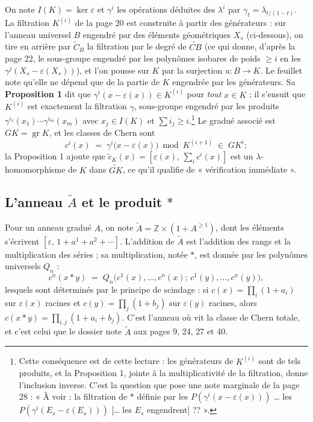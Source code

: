 \documentclass[11pt,a4paper]{article}
\begin{document}
On note $I(K) = \ker \varepsilon$ et $\gamma^{i}$ les opérations déduites des
$\lambda^{i}$ par $\gamma_{t} = \lambda_{t/(1-t)}$. La filtration $K^{(i)}$
de la page 20 est construite à partir des générateurs : sur l'anneau universel
$B$ engendré par des éléments géométriques $X_{s}$ (ci-dessous), on tire en
arrière par $\widetilde{C}_{B}$ la filtration par le degré de
$\widetilde{CB}$ (ce qui donne, d'après la page 22, le sous-groupe engendré
par les polynômes isobares de poids $\geqslant i$ en les
$\gamma^{j}(X_{s} - \varepsilon(X_{s}))$), et l'on pousse sur $K$ par la
surjection $u : B \to K$. Le feuillet note qu'elle ne dépend que de la partie de
$K$ engendrée par les générateurs. Sa \textbf{Proposition 1} dit que
$\gamma^{i}(x - \varepsilon(x)) \in K^{(i)}$ pour \emph{tout} $x \in K$ ; il
s'ensuit que $K^{(i)}$ est exactement la filtration $\gamma$, sous-groupe
engendré par les produits $\gamma^{i_{1}}(x_{1})\cdots\gamma^{i_{m}}(x_{m})$
avec $x_{j} \in I(K)$ et $\sum i_{j} \geqslant i$.\footnote{Cette conséquence
est de cette lecture : les générateurs de $K^{(i)}$ sont de tels produits, et
la Proposition 1, jointe à la multiplicativité de la filtration, donne
l'inclusion inverse. C'est la question que pose une note marginale de la page
28 : « À voir : la filtration de $\ast$ définie par les
$P(\gamma^{i}(x - \varepsilon(x)))$ \ldots{} les
$P(\gamma^{i}(E_{s} - \varepsilon(E_{s})))$ [\ldots{} les $E_{s}$
engendrent] ?? ».} Le gradué associé est $GK = \operatorname{gr} K$, et les
classes de Chern sont
\[
  c^{i}(x) \;=\; \gamma^{i}\bigl(x - \varepsilon(x)\bigr) \bmod K^{(i+1)}
  \;\in\; GK^{i} ;
\]
la Proposition 1 ajoute que $\widetilde{c}_{K}(x) = [\varepsilon(x),\,
\sum_{i} c^{i}(x)]$ est un $\lambda$-homomorphisme de $K$ dans
$\widetilde{GK}$, ce qu'il qualifie de « vérification immédiate ».

\subsection*{L'anneau $\widetilde{A}$ et le produit $\ast$}

Pour un anneau gradué $A$, on note $\widetilde{A} = \mathbb{Z} \times
(1 + A^{\geqslant 1})$, dont les éléments s'écrivent $[\varepsilon,\,
1 + a^{1} + a^{2} + \cdots]$. L'addition de $\widetilde{A}$ est l'addition des
rangs et la multiplication des séries ; sa multiplication, notée $\ast$, est
donnée par les polynômes universels $Q_{n}$ :
\[
  c^{n}(x \ast y) \;=\; Q_{n}\bigl(c^{1}(x), \ldots, c^{n}(x);\,
  c^{1}(y), \ldots, c^{n}(y)\bigr),
\]
lesquels sont déterminés par le principe de scindage : si $c(x) =
\prod_{i}(1 + a_{i})$ sur $\varepsilon(x)$ racines et $c(y) =
\prod_{j}(1 + b_{j})$ sur $\varepsilon(y)$ racines, alors $c(x \ast y) =
\prod_{i,j}(1 + a_{i} + b_{j})$. C'est l'anneau où vit la classe de Chern
totale, et c'est celui que le dossier note $\widetilde{A}$ aux pages 9, 24, 27
et 40.
\end{document}
